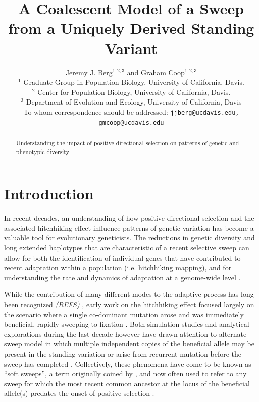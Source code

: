 \documentclass[a4paper,10pt]{article}
\title{A Coalescent Model of a Sweep from a Uniquely Derived Standing Variant}
\author{
Jeremy J. Berg$^{1,2,3}$ and Graham Coop$^{1,2,3}$ \\
$^1$ Graduate Group in Population Biology, University of California, Davis. \\
$^2$ Center for Population Biology, University of California, Davis.\\
$^3$ Department of Evolution and Ecology, University of California, Davis\\
\small To whom correspondence should be addressed: \texttt{jjberg@ucdavis.edu, gmcoop@ucdavis.edu}\\
}
\date{}
\newcommand{\jb}[1]{{\it\color{blue} (#1)} }
\begin{document}
\maketitle

\begin{abstract}
Understanding the impact of positive directional selection on patterns of genetic and phenotypic diversity 
\end{abstract}

\section*{Introduction}

In recent decades, an understanding of how positive directional selection and the associated hitchhiking effect influence patterns of genetic variation has become a valuable tool for evolutionary geneticists. The reductions in genetic diversity and long extended haplotypes that are characteristic of a recent selective sweep can allow for both the identification of individual genes that have contributed to recent adaptation within a population (i.e. hitchhiking mapping), and for understanding the rate and dynamics of adaptation at a genome-wide level \citep{Wiehe:1993th,Andolfatto:2007cq,EyreWalker:2009fq,Elyashiv:2014uc}.

While the contribution of many different modes to the adaptive process has long been recognized \jb{REFS}, early work on the hitchhiking effect focused largely on the scenario where a single co-dominant mutation arose and was immediately beneficial, rapidly sweeping to fixation \citep{Smith1974,Kaplan1989}. Both simulation studies and analytical explorations during the last decade however have drawn attention to alternate sweep model in which multiple independent copies of the beneficial allele may be present in the standing variation or arise from recurrent mutation before the sweep has completed \citep{Innan:2004bk,Przeworski2005,Hermisson2005,Pennings2006a,Pennings2006,Hermisson2008,BARRETT:2008cs,Ralph2010,Pokalyuk2012,Roesti:2014gp,Wilson:2014ke}. Collectively, these phenomena have come to be known as ``soft sweeps'', a term originally coined by \cite{Hermisson2005}, and now often used to refer to any sweep for which the most recent common ancestor at the locus of the beneficial allele(s) predates the onset of positive selection \citep{Messer:2013kh}.
\end{document}

